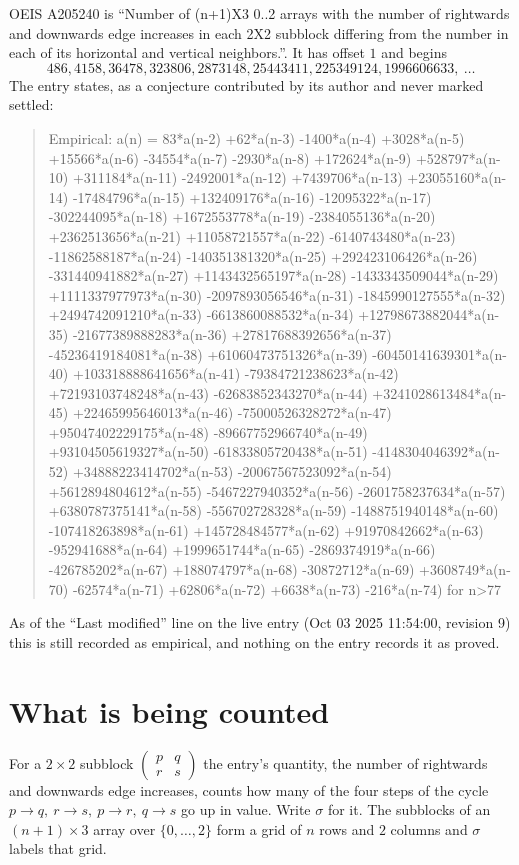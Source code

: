 \documentclass[11pt,a4paper]{article}
\theoremstyle{plain}
\theoremstyle{definition}
\begin{document}
OEIS A205240 is ``Number of (n+1)X3 0..2 arrays with the number of rightwards and downwards edge increases in each 2X2 subblock differing from the number in each of its horizontal and vertical neighbors.''. It has offset $1$ and begins
\[
486, 4158, 36478, 323806, 2873148, 25443411, 225349124, 1996606633,\ \dots
\]
The entry states, as a conjecture contributed by its author and never marked settled:
\begin{quote}
Empirical: a(n) = 83*a(n-2) +62*a(n-3) -1400*a(n-4) +3028*a(n-5) +15566*a(n-6) -34554*a(n-7) -2930*a(n-8) +172624*a(n-9) +528797*a(n-10) +311184*a(n-11) -2492001*a(n-12) +7439706*a(n-13) +23055160*a(n-14) -17484796*a(n-15) +132409176*a(n-16) -12095322*a(n-17) -302244095*a(n-18) +1672553778*a(n-19) -2384055136*a(n-20) +2362513656*a(n-21) +11058721557*a(n-22) -6140743480*a(n-23) -11862588187*a(n-24) -140351381320*a(n-25) +292423106426*a(n-26) -331440941882*a(n-27) +1143432565197*a(n-28) -1433343509044*a(n-29) +1111337977973*a(n-30) -2097893056546*a(n-31) -1845990127555*a(n-32) +2494742091210*a(n-33) -6613860088532*a(n-34) +12798673882044*a(n-35) -21677389888283*a(n-36) +27817688392656*a(n-37) -45236419184081*a(n-38) +61060473751326*a(n-39) -60450141639301*a(n-40) +103318888641656*a(n-41) -79384721238623*a(n-42) +72193103748248*a(n-43) -62683852343270*a(n-44) +3241028613484*a(n-45) +22465995646013*a(n-46) -75000526328272*a(n-47) +95047402229175*a(n-48) -89667752966740*a(n-49) +93104505619327*a(n-50) -61833805720438*a(n-51) -4148304046392*a(n-52) +34888223414702*a(n-53) -20067567523092*a(n-54) +5612894804612*a(n-55) -5467227940352*a(n-56) -2601758237634*a(n-57) +6380787375141*a(n-58) -556702728328*a(n-59) -1488751940148*a(n-60) -107418263898*a(n-61) +145728484577*a(n-62) +91970842662*a(n-63) -952941688*a(n-64) +1999651744*a(n-65) -2869374919*a(n-66) -426785202*a(n-67) +188074797*a(n-68) -30872712*a(n-69) +3608749*a(n-70) -62574*a(n-71) +62806*a(n-72) +6638*a(n-73) -216*a(n-74) for n>77
\end{quote}
As of the ``Last modified'' line on the live entry (Oct 03 2025 11:54:00, revision 9) this is still
recorded as empirical, and nothing on the entry records it as proved.

\section{What is being counted}

For a $2\times2$ subblock $\begin{pmatrix}p&q\\r&s\end{pmatrix}$ the
entry's quantity, the number of rightwards and downwards edge increases, counts how many of the four steps of the cycle $p\to q,\ r\to s,\ p\to r,\ q\to s$ go up in value. Write $\sigma$ for it. The subblocks of an
$(n+1)\times3$ array over $\{0,\dots,2\}$ form a grid of $n$ rows and $2$
columns and $\sigma$ labels that grid.
\end{document}
